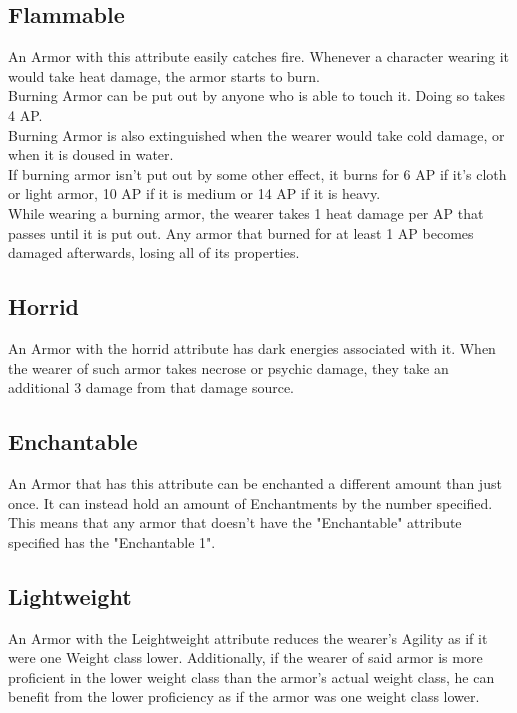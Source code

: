 \subsection{Flammable}\label{armor:flammable}
An Armor with this attribute easily catches fire.
Whenever a character wearing it would take heat damage, the armor starts to burn.\\
Burning Armor can be put out by anyone who is able to touch it.
Doing so takes 4 AP.\\
Burning Armor is also extinguished when the wearer would take cold damage, or when it is doused in water.\\
If burning armor isn't put out by some other effect, it burns for 6 AP if it's cloth or light armor, 10 AP if it is medium or 14 AP if it is heavy.\\
While wearing a burning armor, the wearer takes 1 heat damage per AP that passes until it is put out.
Any armor that burned for at least 1 AP becomes damaged afterwards, losing all of its properties.

\subsection{Horrid}\label{armor:horrid}
An Armor with the horrid attribute has dark energies associated with it.
When the wearer of such armor takes necrose or psychic damage, they take an additional 3 damage from that damage source.

\subsection{Enchantable}\label{armor:enchantable}
An Armor that has this attribute can be enchanted a different amount than just once.
It can instead hold an amount of Enchantments by the number specified.
This means that any armor that doesn't have the "Enchantable" attribute specified has the "Enchantable 1".

\subsection{Lightweight}\label{armor:lightweight}
An Armor with the Leightweight attribute reduces the wearer's Agility as if it were one Weight class lower.
Additionally, if the wearer of said armor is more proficient in the lower weight class than the armor's actual weight class, he can benefit from the lower proficiency as if the armor was one weight class lower.

